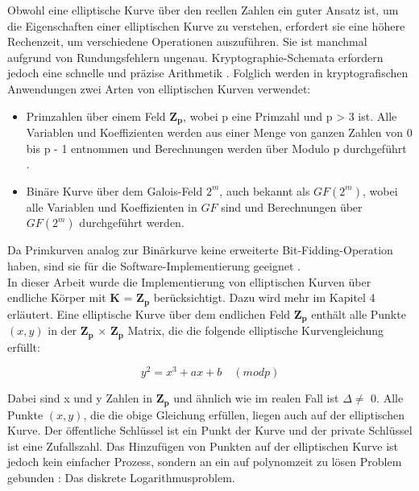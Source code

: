 Obwohl eine elliptische Kurve über den reellen Zahlen ein guter Ansatz ist, um die Eigenschaften einer elliptischen Kurve zu verstehen, erfordert sie eine höhere Rechenzeit, um verschiedene Operationen auszuführen. Sie ist manchmal aufgrund von Rundungsfehlern ungenau. Kryptographie-Schemata erfordern jedoch eine schnelle und präzise Arithmetik \cite{razad}. Folglich werden in kryptografischen Anwendungen zwei Arten von elliptischen Kurven verwendet:
	\begin{itemize}
	    \item Primzahlen über einem Feld $ \mathbf{Z_p} $, wobei p eine Primzahl und p > 3 ist. Alle Variablen und Koeffizienten werden aus einer Menge von ganzen Zahlen von 0 bis p - 1 entnommen und Berechnungen werden über Modulo p durchgeführt \cite{werner}.
        \item 	Binäre Kurve über dem Galois-Feld $ 2^m $, auch bekannt als $ GF(2^m) $, wobei alle Variablen und Koeffizienten in $ GF $ sind und Berechnungen über $ GF(2^m) $ durchgeführt werden.
	\end{itemize}

Da Primkurven analog zur Binärkurve keine erweiterte Bit-Fidding-Operation haben, sind sie für die Software-Implementierung geeignet \cite{razad}.\\



In dieser Arbeit wurde die Implementierung von elliptischen Kurven über endliche Körper mit $ \mathbf{K} $ = $ \mathbf{Z_p} $ berücksichtigt. Dazu wird mehr im Kapitel 4 erläutert.
Eine elliptische Kurve über dem endlichen Feld $ \mathbf{Z_p} $ enthält alle Punkte $ (x, y) $ in der $ \mathbf{Z_p} $ $ \times $ $ \mathbf{Z_p} $ Matrix, die die folgende elliptische Kurvengleichung erfüllt: 

\begin{ceqn}

\begin{equation}
     y^2 = x^3 + ax + b  \quad (mod p)
     \label{curve}
\end{equation}

\end{ceqn}

Dabei sind x und y Zahlen in $ \mathbf{Z_p} $  und ähnlich wie im realen Fall ist $ \Delta \neq $ 0.
Alle Punkte $ (x, y) $, die die obige Gleichung  erfüllen, liegen auch auf der elliptischen Kurve. Der öffentliche Schlüssel ist ein Punkt der Kurve und der private Schlüssel ist eine Zufallszahl. Das Hinzufügen von Punkten auf der elliptischen Kurve ist jedoch kein einfacher Prozess, sondern an ein auf polynomzeit zu lösen Problem gebunden \cite{mo2014}: Das diskrete Logarithmusproblem. 


